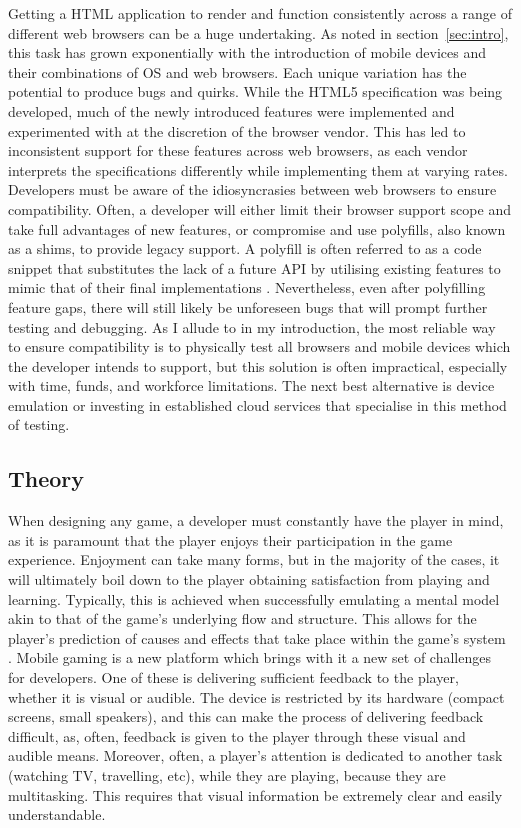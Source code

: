 \documentclass[final]{cmpreport}
\begin{document}
Getting a HTML application to render and function consistently across a range of different web browsers can be a huge undertaking. As noted in section~\ref{sec:intro}, this task has grown exponentially with the introduction of mobile devices and their combinations of OS and web browsers. Each unique variation has the potential to produce bugs and quirks. While the HTML5 specification was being developed, much of the newly introduced features were implemented and experimented with at the discretion of the browser vendor. This has led to inconsistent support for these features across web browsers, as each vendor interprets the specifications differently while implementing them at varying rates. Developers must be aware of the idiosyncrasies between web browsers to ensure compatibility. Often, a developer will either limit their browser support scope and take full advantages of new features, or compromise and use polyfills, also known as a shims, to provide legacy support. A polyfill is often referred to as a code snippet that substitutes the lack of a future API by utilising existing features to mimic that of their final implementations \cite{Lawson}. Nevertheless, even after polyfilling feature gaps, there will still likely be unforeseen bugs that will prompt further testing and debugging. As I allude to in my introduction, the most reliable way to ensure compatibility is to physically test all browsers and mobile devices which the developer intends to support, but this solution is often impractical, especially with time, funds, and workforce limitations. The next best alternative is device emulation or investing in established cloud services that specialise in this method of testing.

\subsection{Theory}
When designing any game, a developer must constantly have the player in mind, as it is paramount that the player enjoys their participation in the game experience. Enjoyment can take many forms, but in the majority of the cases, it will ultimately boil down to the player obtaining satisfaction from playing and learning. Typically, this is achieved when successfully emulating a mental model akin to that of the game's underlying flow and structure. This allows for the player's prediction of causes and effects that take place within the game's system \citep{Cook}. Mobile gaming is a new platform which brings with it a new set of challenges for developers. One of these is delivering sufficient feedback to the player, whether it is visual or audible. The device is restricted by its hardware (compact screens, small speakers), and this can make the process of delivering feedback difficult, as, often, feedback is given to the player through these visual and audible means. Moreover, often, a player's attention is dedicated to another task (watching TV, travelling, etc), while they are playing, because they are multitasking. This requires that visual information be  extremely clear and easily understandable.
\end{document}
